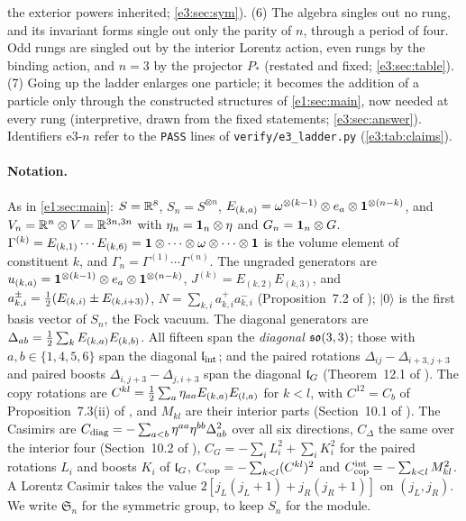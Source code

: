 the exterior powers inherited; \cref{e3:sec:sym}). (6) The algebra singles out no rung, and its invariant forms single out only the parity of $n$, through a period of four. Odd rungs are
singled out by the interior Lorentz action, even rungs by the binding action, and $n=3$ by the projector $P_*$ (restated and fixed; \cref{e3:sec:table}). (7) Going up the ladder
enlarges one particle; it becomes the addition of a particle only through the constructed structures of \cref{e1:sec:main}, now needed at every
rung (interpretive, drawn from the fixed statements; \cref{e3:sec:answer}). Identifiers e3-$n$ refer to the \texttt{PASS} lines of
\texttt{verify/e3\_ladder.py} (\cref{e3:tab:claims}).

\paragraph{Notation.} As in \cref{e1:sec:main}: $S=\mathbb{R}^8$, $S_n=S^{\otimes n}$, $E_{(k,a)}=\omega^{\otimes(k-1)}\otimes e_a\otimes\mathbf 1^{\otimes(n-k)}$, and
$V_n=\mathbb{R}^n\otimes V=\mathbb{R}^{3n,3n}$ with $\eta_n=\mathbf 1_n\otimes\eta$ and $G_n=\mathbf 1_n\otimes G$. $\Gamma^{(k)}=E_{(k,1)}\cdots E_{(k,6)}=\mathbf 1\otimes\cdots\otimes\omega\otimes\cdots\otimes\mathbf 1$ is the
volume element of constituent $k$, and $\Gamma_n=\Gamma^{(1)}\cdots\Gamma^{(n)}$. The ungraded generators are
$u_{(k,a)}=\mathbf 1^{\otimes(k-1)}\otimes e_a\otimes\mathbf 1^{\otimes(n-k)}$, $J^{(k)}=E_{(k,2)}E_{(k,3)}$, and $a^\pm_{k,i}=\tfrac12(E_{(k,i)}\pm E_{(k,i+3)})$, $N=\sum_{k,i}a^+_{k,i}a^-_{k,i}$
(Proposition~7.2 of \cite{RE}); $|0\rangle$ is the first basis vector of $S_n$, the Fock vacuum. The diagonal generators are
$\Delta_{ab}=\tfrac12\sum_kE_{(k,a)}E_{(k,b)}$. All fifteen span the \emph{diagonal} $\mathfrak{so}(3,3)$; those with $a,b\in\{1,4,5,6\}$ span the diagonal $\mathfrak l_{\rm int}$; and the
paired rotations $\Delta_{ij}-\Delta_{i+3,j+3}$ and paired boosts $\Delta_{i,j+3}-\Delta_{j,i+3}$ span the diagonal $\mathfrak l_G$ (Theorem~12.1 of \cite{ES17}). The
copy rotations are $C^{kl}=\tfrac12\sum_a\eta_{aa}E_{(k,a)}E_{(l,a)}$ for $k<l$, with $C^{12}=C_b$ of Proposition~7.3(ii) of \cite{RE}, and $M_{kl}$ are their
interior parts (Section~10.1 of \cite{ES17}). The Casimirs are $C_{\rm diag}=-\sum_{a<b}\eta^{aa}\eta^{bb}\Delta_{ab}^2$ over all six directions,
$C_\Delta$ the same over the interior four (Section~10.2 of \cite{ES17}), $C_G=-\sum_iL_i^2+\sum_iK_i^2$ for the paired rotations $L_i$ and boosts
$K_i$ of $\mathfrak l_G$, $C_{\rm cop}=-\sum_{k<l}(C^{kl})^2$ and $C^{\rm int}_{\rm cop}=-\sum_{k<l}M_{kl}^2$. A Lorentz Casimir takes the value
$2[j_L(j_L+1)+j_R(j_R+1)]$ on $(j_L,j_R)$. We write $\mathfrak S_n$ for the symmetric group, to keep $S_n$ for the module.

